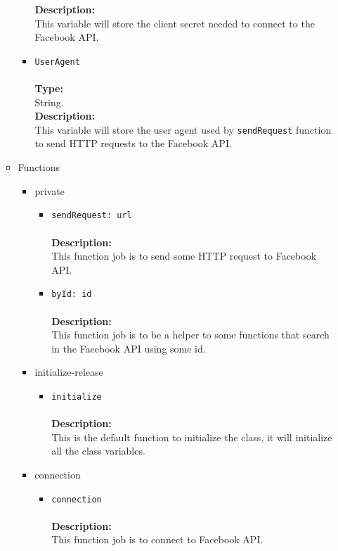 \begin{itemize}
\begin{itemize}
\begin{itemize}
     \textbf{Description:}\\
     This variable will store the client secret needed to connect to the Facebook API.\\
\item \verb~UserAgent~\\\\
\textbf{Type:}\\
     String.\\

     \textbf{Description:}\\
     This variable will store the user agent used by \verb~sendRequest~ function to send HTTP requests to the Facebook API.
\end{itemize}


\item Functions
\label{sec-1-4-1-2-2}%
\begin{itemize}

\item private
\label{sec-1-4-1-2-2-1}%
\begin{itemize}
\item \verb~sendRequest: url~\\\\
\textbf{Description:}\\
      This function job is to send some HTTP request to Facebook API.\\
\item \verb~byId: id~\\\\
\textbf{Description:}\\
      This function job is to be a helper to some functions that search in the Facebook API using some id.
\end{itemize}


\item initialize-release
\label{sec-1-4-1-2-2-2}%
\begin{itemize}
\item \verb~initialize~\\\\
\textbf{Description:}\\
      This is the default function to initialize the class, it will initialize all the class variables.
\end{itemize}


\item connection
\label{sec-1-4-1-2-2-3}%
\begin{itemize}
\item \verb~connection~\\\\
\textbf{Description:}\\
      This function job is to connect to Facebook API.\\
\end{itemize}



\end{itemize}
\end{itemize}
\end{itemize}
